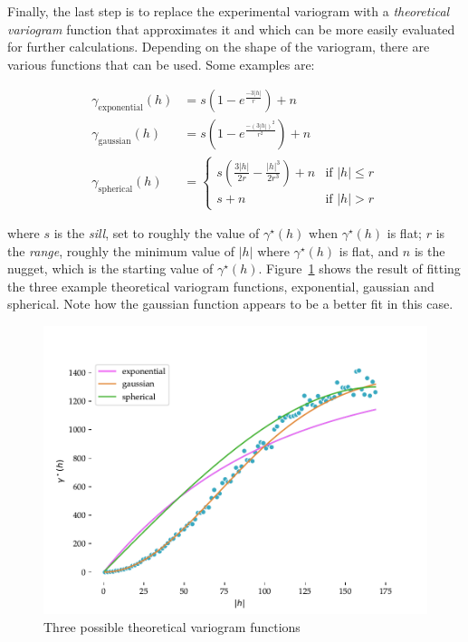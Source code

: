 Finally, the last step is to replace the experimental variogram with a \emph{theoretical variogram} function that approximates it and which can be more easily evaluated for further calculations.
Depending on the shape of the variogram, there are various functions that can be used.
Some examples are:

\begin{align}
\gamma_\mathrm{exponential}(h) &= s \left(1 - e^\frac{-3|h|}{r}\right) + n \\
\gamma_\mathrm{gaussian}(h) &= s \left(1 - e^\frac{-\left(3|h|\right)^2}{r^2}\right) + n \\
\gamma_\mathrm{spherical}(h) &= \begin{cases} 
   s \left(\frac{3|h|}{2r} - \frac{|h|^3}{2r^3}\right) + n & \text{if } |h| \leq r \\
   s + n & \text{if } |h| > r
  \end{cases}
\end{align}

where \(s\) is the \emph{sill}, set to roughly the value of \(\gamma^\star(h)\) when \(\gamma^\star(h)\) is  flat; \(r\) is the \emph{range}, roughly the minimum value of \(|h|\) where \(\gamma^\star(h)\) is flat, and \(n\) is the nugget, which is the starting value of \(\gamma^\star(h)\).
Figure~\ref{fig:theoretical_variogram} shows the result of fitting the three example theoretical variogram functions, exponential, gaussian and spherical.
Note how the gaussian function appears to be a better fit in this case.

\begin{figure}[htbp]
\centering
\includegraphics[width=0.9\linewidth]{figs/theoretical_variogram}
\caption{Three possible theoretical variogram functions}%
\label{fig:theoretical_variogram}
\end{figure}

